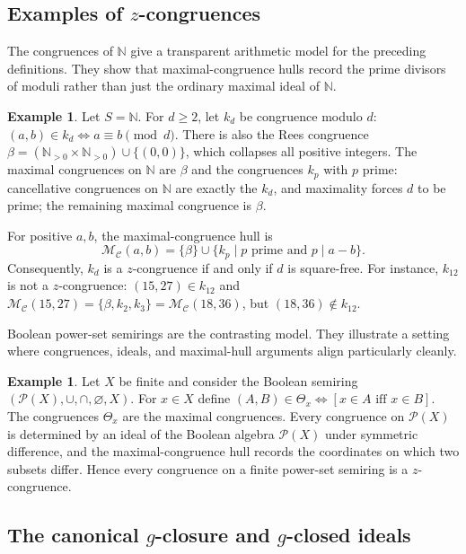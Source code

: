 \documentclass[11pt,leqno]{amsart}
\theoremstyle{plain}
\theoremstyle{definition}
\newtheorem{example}[theorem]{Example}
\theoremstyle{remark}
\numberwithin{equation}{section}
\newcommand{\MC}{\mathcal M_{\mathcal C}}
\newcommand{\N}{\mathds N}
\begin{document}
\subsection{Examples of \texorpdfstring{$z$}{z}-congruences}

The congruences of $\N$ give a transparent arithmetic model for
the preceding definitions.
They show that maximal-congruence hulls record the prime divisors
of moduli rather than just the ordinary maximal ideal of $\N$.

\begin{example}\label{ex:N-congruences}
Let $S=\N$.
For $d\geqslant2$, let $k_d$ be congruence modulo $d$:
$(a,b)\in k_d\Leftrightarrow a\equiv b\pmod{d}$.
There is also the Rees congruence
$\beta=(\N_{>0}\times\N_{>0})\cup\{(0,0)\}$,
which collapses all positive integers.
The maximal congruences on $\N$ are $\beta$ and the congruences
$k_p$ with $p$ prime:
cancellative congruences on $\N$ are exactly the $k_d$,
and maximality forces $d$ to be prime;
the remaining maximal congruence is $\beta$.

For positive $a,b$, the maximal-congruence hull is
\[
\MC(a,b)=\{\beta\}\cup\{k_p\mid p\text{ prime and }p\mid a-b\}.
\]
Consequently, $k_d$ is a $z$-congruence if and only if $d$ is
square-free.
For instance, $k_{12}$ is not a $z$-congruence:
$(15,27)\in k_{12}$ and
$\MC(15,27)=\{\beta,k_2,k_3\}=\MC(18,36)$,
but $(18,36)\notin k_{12}$.
\end{example}

Boolean power-set semirings are the contrasting model.
They illustrate a setting where congruences, ideals, and maximal-hull
arguments align particularly cleanly.

\begin{example}\label{ex:powerset}
Let $X$ be finite and consider the Boolean semiring
$(\mathcal{P}(X),\cup,\cap,\varnothing,X)$.
For $x\in X$ define $(A,B)\in\Theta_x\Leftrightarrow[x\in A
\text{ iff }x\in B]$.
The congruences $\Theta_x$ are the maximal congruences.
Every congruence on $\mathcal{P}(X)$ is determined by an ideal
of the Boolean algebra $\mathcal{P}(X)$ under symmetric difference,
and the maximal-congruence hull records the coordinates on which
two subsets differ.
Hence every congruence on a finite power-set semiring is a
$z$-congruence.
\end{example}

\subsection{The canonical \texorpdfstring{$g$}{g}-closure
and \texorpdfstring{$g$}{g}-closed ideals}
\end{document}
